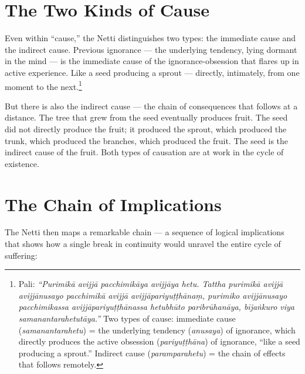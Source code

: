 \section*{The Two Kinds of Cause}

Even within ``cause,'' the Netti distinguishes two types: the immediate cause and the indirect cause. Previous ignorance --- the underlying tendency, lying dormant in the mind --- is the immediate cause of the ignorance-obsession that flares up in active experience. Like a seed producing a sprout --- directly, intimately, from one moment to the next.\footnote{Pali: \textit{``Purimikā avijjā pacchimikāya avijjāya hetu. Tattha purimikā avijjā avijjānusayo pacchimikā avijjā avijjāpariyuṭṭhānaṃ, purimiko avijjānusayo pacchimikassa avijjāpariyuṭṭhānassa hetubhūto paribrūhanāya, bījaṅkuro viya samanantarahetutāya.''} Two types of cause: immediate cause (\textit{samanantarahetu}) = the underlying tendency (\textit{anusaya}) of ignorance, which directly produces the active obsession (\textit{pariyuṭṭhāna}) of ignorance, ``like a seed producing a sprout.'' Indirect cause (\textit{paramparahetu}) = the chain of effects that follows remotely.}

But there is also the indirect cause --- the chain of consequences that follows at a distance. The tree that grew from the seed eventually produces fruit. The seed did not directly produce the fruit; it produced the sprout, which produced the trunk, which produced the branches, which produced the fruit. The seed is the indirect cause of the fruit. Both types of causation are at work in the cycle of existence.

\section*{The Chain of Implications}

The Netti then maps a remarkable chain --- a sequence of logical implications that shows how a single break in continuity would unravel the entire cycle of suffering:

